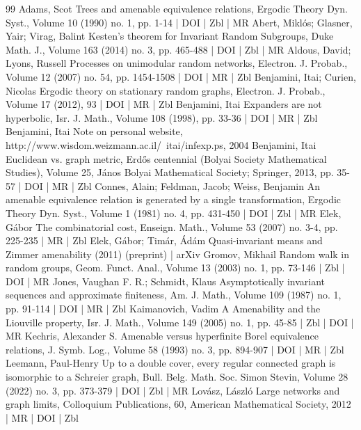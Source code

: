 \begin{thebibliography}{99}
 Adams, Scot Trees and amenable equivalence relations, Ergodic Theory Dyn. Syst., Volume 10 (1990) no. 1, pp. 1-14 | DOI | Zbl | MR
 Abert, Miklós; Glasner, Yair; Virag, Balint Kesten’s theorem for Invariant Random Subgroups, Duke Math. J., Volume 163 (2014) no. 3, pp. 465-488 | DOI | Zbl | MR
 Aldous, David; Lyons, Russell Processes on unimodular random networks, Electron. J. Probab., Volume 12 (2007) no. 54, pp. 1454-1508 | DOI | MR | Zbl
 Benjamini, Itai; Curien, Nicolas Ergodic theory on stationary random graphs, Electron. J. Probab., Volume 17 (2012), 93 | DOI | MR | Zbl
 Benjamini, Itai Expanders are not hyperbolic, Isr. J. Math., Volume 108 (1998), pp. 33-36 | DOI | MR | Zbl
 Benjamini, Itai Note on personal website, http://www.wisdom.weizmann.ac.il/~itai/infexp.ps, 2004
 Benjamini, Itai Euclidean vs. graph metric, Erdős centennial (Bolyai Society Mathematical Studies), Volume 25, János Bolyai Mathematical Society; Springer, 2013, pp. 35-57 | DOI | MR | Zbl
 Connes, Alain; Feldman, Jacob; Weiss, Benjamin An amenable equivalence relation is generated by a single transformation, Ergodic Theory Dyn. Syst., Volume 1 (1981) no. 4, pp. 431-450 | DOI | Zbl | MR
 Elek, Gábor The combinatorial cost, Enseign. Math., Volume 53 (2007) no. 3-4, pp. 225-235 | MR | Zbl
 Elek, Gábor; Timár, Ádám Quasi-invariant means and Zimmer amenability (2011) (preprint) | arXiv
 Gromov, Mikhail Random walk in random groups, Geom. Funct. Anal., Volume 13 (2003) no. 1, pp. 73-146 | Zbl | DOI | MR
 Jones, Vaughan F. R.; Schmidt, Klaus Asymptotically invariant sequences and approximate finiteness, Am. J. Math., Volume 109 (1987) no. 1, pp. 91-114 | DOI | MR | Zbl
 Kaimanovich, Vadim A Amenability and the Liouville property, Isr. J. Math., Volume 149 (2005) no. 1, pp. 45-85 | Zbl | DOI | MR
 Kechris, Alexander S. Amenable versus hyperfinite Borel equivalence relations, J. Symb. Log., Volume 58 (1993) no. 3, pp. 894-907 | DOI | MR | Zbl
 Leemann, Paul-Henry Up to a double cover, every regular connected graph is isomorphic to a Schreier graph, Bull. Belg. Math. Soc. Simon Stevin, Volume 28 (2022) no. 3, pp. 373-379 | DOI | Zbl | MR
 Lovász, László Large networks and graph limits, Colloquium Publications, 60, American Mathematical Society, 2012 | MR | DOI | Zbl

\end{thebibliography}
